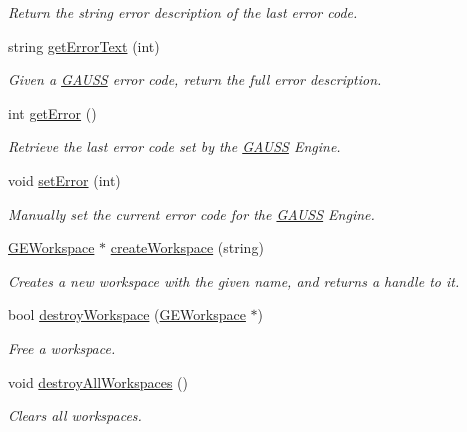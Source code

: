 \begin{DoxyCompactItemize}
\begin{DoxyCompactList}\small\item\em Return the string error description of the last error code. \end{DoxyCompactList}\item 
string \hyperlink{class_g_a_u_s_s_a6e487c8dc379177510f76e322b0e50de}{get\-Error\-Text} (int)
\begin{DoxyCompactList}\small\item\em Given a \hyperlink{class_g_a_u_s_s}{G\-A\-U\-S\-S} error code, return the full error description. \end{DoxyCompactList}\item 
int \hyperlink{class_g_a_u_s_s_a6a62cfdb5ea03e0352c271c60afe96fc}{get\-Error} ()
\begin{DoxyCompactList}\small\item\em Retrieve the last error code set by the \hyperlink{class_g_a_u_s_s}{G\-A\-U\-S\-S} Engine. \end{DoxyCompactList}\item 
void \hyperlink{class_g_a_u_s_s_a4adc9a33b8be97b1a6592160fea4a4eb}{set\-Error} (int)
\begin{DoxyCompactList}\small\item\em Manually set the current error code for the \hyperlink{class_g_a_u_s_s}{G\-A\-U\-S\-S} Engine. \end{DoxyCompactList}\item 
\hyperlink{class_g_e_workspace}{G\-E\-Workspace} $\ast$ \hyperlink{class_g_a_u_s_s_aa300ef0a2a359b736734b4350706ef89}{create\-Workspace} (string)
\begin{DoxyCompactList}\small\item\em Creates a new workspace with the given name, and returns a handle to it. \end{DoxyCompactList}\item 
bool \hyperlink{class_g_a_u_s_s_a22e8b7eebcc1e77708a7cfd9a858e769}{destroy\-Workspace} (\hyperlink{class_g_e_workspace}{G\-E\-Workspace} $\ast$)
\begin{DoxyCompactList}\small\item\em Free a workspace. \end{DoxyCompactList}\item 
void \hyperlink{class_g_a_u_s_s_ab9515a6de5028f18138e6c87e1512c91}{destroy\-All\-Workspaces} ()
\begin{DoxyCompactList}\small\item\em Clears all workspaces. \end{DoxyCompactList}\item 

\end{DoxyCompactItemize}
